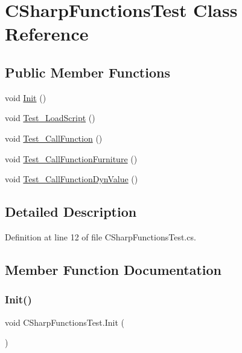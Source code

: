 \hypertarget{class_c_sharp_functions_test}{}\section{C\+Sharp\+Functions\+Test Class Reference}
\label{class_c_sharp_functions_test}
\subsection*{Public Member Functions}
\begin{DoxyCompactItemize}
\item 
void \hyperlink{class_c_sharp_functions_test_a979ae2c5fcdd8f9530498ef902834c1b}{Init} ()
\item 
void \hyperlink{class_c_sharp_functions_test_aea76f211eeeb92f51833ba0224ca4ac8}{Test\+\_\+\+Load\+Script} ()
\item 
void \hyperlink{class_c_sharp_functions_test_a760d304f18164885f3cb99ce0fe75641}{Test\+\_\+\+Call\+Function} ()
\item 
void \hyperlink{class_c_sharp_functions_test_a058502cb49e54348c91f64699f305c4d}{Test\+\_\+\+Call\+Function\+Furniture} ()
\item 
void \hyperlink{class_c_sharp_functions_test_a24548ed978c888fdf2b12e505c4ba0d0}{Test\+\_\+\+Call\+Function\+Dyn\+Value} ()
\end{DoxyCompactItemize}


\subsection{Detailed Description}


Definition at line 12 of file C\+Sharp\+Functions\+Test.\+cs.



\subsection{Member Function Documentation}
\mbox{\label{class_c_sharp_functions_test_a979ae2c5fcdd8f9530498ef902834c1b}} 
\subsubsection{\texorpdfstring{Init()}{Init()}}
{\footnotesize\ttfamily void C\+Sharp\+Functions\+Test.\+Init (\begin{DoxyParamCaption}{ }\end{DoxyParamCaption})}



